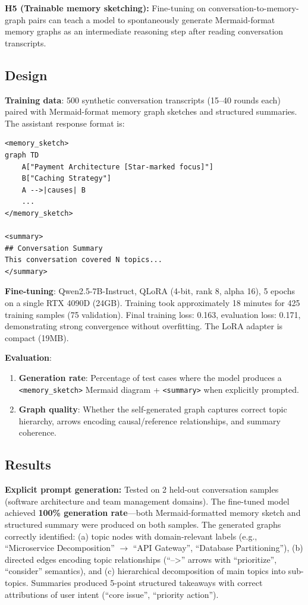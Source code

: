 \documentclass[11pt,a4paper]{article}
\begin{document}
\textbf{H5 (Trainable memory sketching):} Fine-tuning on conversation-to-memory-graph pairs can teach a model to spontaneously generate Mermaid-format memory graphs as an intermediate reasoning step after reading conversation transcripts.

\subsection{Design}

\textbf{Training data}: 500 synthetic conversation transcripts (15--40 rounds each) paired with Mermaid-format memory graph sketches and structured summaries. The assistant response format is:

\begin{verbatim}
<memory_sketch>
graph TD
    A["Payment Architecture [Star-marked focus]"]
    B["Caching Strategy"]
    A -->|causes| B
    ...
</memory_sketch>

<summary>
## Conversation Summary
This conversation covered N topics...
</summary>
\end{verbatim}

\textbf{Fine-tuning}: Qwen2.5-7B-Instruct, QLoRA (4-bit, rank 8, alpha 16), 5 epochs on a single RTX 4090D (24GB). Training took approximately 18 minutes for 425 training samples (75 validation). Final training loss: 0.163, evaluation loss: 0.171, demonstrating strong convergence without overfitting. The LoRA adapter is compact (19MB).

\textbf{Evaluation}:
\begin{enumerate}[nosep]
\item \textbf{Generation rate}: Percentage of test cases where the model produces a \texttt{<memory\_sketch>} Mermaid diagram + \texttt{<summary>} when explicitly prompted.
\item \textbf{Graph quality}: Whether the self-generated graph captures correct topic hierarchy, arrows encoding causal/reference relationships, and summary coherence.
\end{enumerate}

\subsection{Results}

\textbf{Explicit prompt generation:} Tested on 2 held-out conversation samples (software architecture and team management domains). The fine-tuned model achieved \textbf{100\% generation rate}---both Mermaid-formatted memory sketch and structured summary were produced on both samples. The generated graphs correctly identified: (a) topic nodes with domain-relevant labels (e.g., ``Microservice Decomposition'' $\rightarrow$ ``API Gateway'', ``Database Partitioning''), (b) directed edges encoding topic relationships (``-->'' arrows with ``prioritize'', ``consider'' semantics), and (c) hierarchical decomposition of main topics into sub-topics. Summaries produced 5-point structured takeaways with correct attributions of user intent (``core issue'', ``priority action'').
\end{document}
